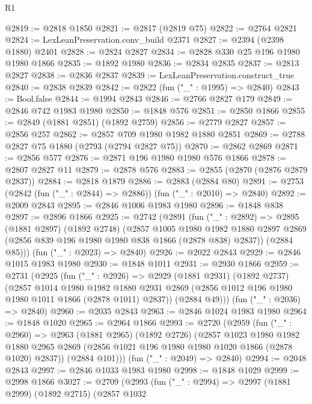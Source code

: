 \begin{lexlean}{R1}
\begin{coremodule}
@2819 := @2818 @1850
@2821 := @2817 (@2819 @75)
@2822 := @2764 @2821
@2824 := LexLeanPreservation.conv_build @2371
@2827 := @2394 (@2398 @1880) @2401
@2828 := @2824 @2827
@2834 := @2828 @330 @25 @196 @1980 @1980 @1866
@2835 := @1892 @1980
@2836 := @2834 @2835
@2837 := @2813 @2827
@2838 := @2836 @2837
@2839 := LexLeanPreservation.construct_true
@2840 := @2838 @2839
@2842 := @2822 (fun ("_" : @1995) => @2840)
@2843 := Bool.false
@2844 := @1994 @2843
@2846 := @2766 @2827 @179
@2849 := @2846 @742 @1983 @1980
@2850 := @1848 @576
@2851 := @2850 @1866
@2855 := @2849 (@1881 @2851) (@1892 @2759)
@2856 := @2779 @2827
@2857 := @2856 @257
@2862 := @2857 @709 @1980 @1982 @1880 @2851
@2869 := @2788 @2827 @75 @1880 (@2793 (@2794 @2827 @75))
@2870 := @2862 @2869
@2871 := @2856 @577
@2876 := @2871 @196 @1980 @1980 @576 @1866
@2878 := @2807 @2827 @11
@2879 := @2878 @576
@2883 := @2855 (@2870 (@2876 @2879 @2837))
@2884 := @2818 @1879
@2886 := @2883 (@2884 @80)
@2891 := @2753 (@2842 (fun ("_" : @2844) => @2886)) (fun ("_" : @2010) => @2840)
@2892 := @2009 @2843
@2895 := @2846 @1006 @1983 @1980
@2896 := @1848 @838
@2897 := @2896 @1866
@2925 := @2742
    (@2891
      (fun ("_" : @2892) =>
      @2895
        (@1881 @2897)
        (@1892 @2748)
        (@2857
          @1005
          @1980
          @1982
          @1880
          @2897
          @2869
          (@2856 @839 @196 @1980 @1980 @838 @1866 (@2878 @838) @2837))
        (@2884 @85)))
    (fun ("_" : @2023) => @2840)
@2926 := @2022 @2843
@2929 := @2846 @1015 @1983 @1980
@2930 := @1848 @1011
@2931 := @2930 @1866
@2959 := @2731
    (@2925
      (fun ("_" : @2926) =>
      @2929
        (@1881 @2931)
        (@1892 @2737)
        (@2857
          @1014
          @1980
          @1982
          @1880
          @2931
          @2869
          (@2856 @1012 @196 @1980 @1980 @1011 @1866 (@2878 @1011) @2837))
        (@2884 @49)))
    (fun ("_" : @2036) => @2840)
@2960 := @2035 @2843
@2963 := @2846 @1024 @1983 @1980
@2964 := @1848 @1020
@2965 := @2964 @1866
@2993 := @2720
    (@2959
      (fun ("_" : @2960) =>
      @2963
        (@1881 @2965)
        (@1892 @2726)
        (@2857
          @1023
          @1980
          @1982
          @1880
          @2965
          @2869
          (@2856 @1021 @196 @1980 @1980 @1020 @1866 (@2878 @1020) @2837))
        (@2884 @101)))
    (fun ("_" : @2049) => @2840)
@2994 := @2048 @2843
@2997 := @2846 @1033 @1983 @1980
@2998 := @1848 @1029
@2999 := @2998 @1866
@3027 := @2709
    (@2993
      (fun ("_" : @2994) =>
      @2997
        (@1881 @2999)
        (@1892 @2715)
        (@2857
          @1032

\end{coremodule}
\end{lexlean}
